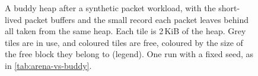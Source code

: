 \begin{figure}[htb]
\centering
\begin{minipage}[t]{0.32\linewidth}
  \small
  
\end{minipage}%
\begin{minipage}[t]{0.66\linewidth}
  \centering
  
\end{minipage}
\caption{A buddy heap after a synthetic packet workload, with the
short-lived packet buffers and the small record each packet leaves behind
all taken from the same heap. Each tile is 2\,KiB of the heap. Grey tiles
are in use, and coloured tiles are free, coloured by the size of the free
block they belong to (legend). One run with a fixed seed, as in
\cref{tab:arena-vs-buddy}.}
\label{fig:fragmentation-color-fragmented}
\end{figure}
